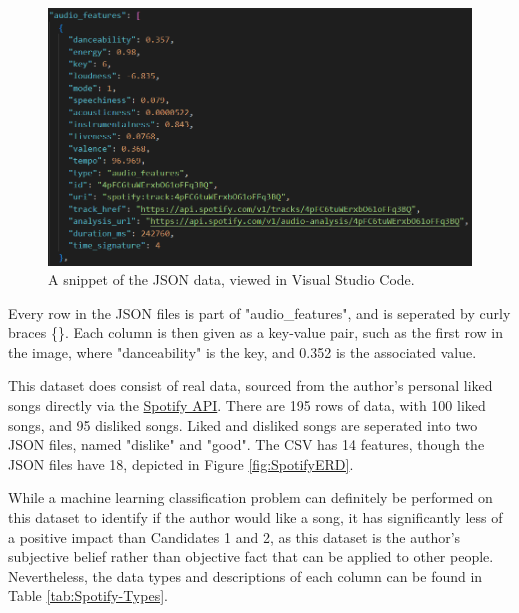 \documentclass[12pt]{report}
\begin{document}
\begin{figure}[H]
    \centering
    \includegraphics[width=.75\linewidth]{spotifySnippet.png}
    \caption{A snippet of the JSON data, viewed in Visual Studio Code.}
    \label{fig:spotifySnippet}
\end{figure}

Every row in the JSON files is part of "audio\_features", and is seperated by curly braces \{\}. Each column is then given as a 
key-value pair, such as the first row in the image, where "danceability" is the key, and 0.352 is the associated value.

\noindent This dataset does consist of real data, sourced from the author's personal liked songs directly via the 
\href{https://developer.spotify.com/documentation/web-api}{Spotify API}. There are 195 rows of data, with 100 liked songs, and 95 disliked songs.
Liked and disliked songs are seperated into two JSON files, named "dislike" and "good". The CSV has 14 features, though the JSON files have 18,
depicted in Figure \ref{fig:SpotifyERD}.


While a machine learning classification problem can definitely be performed on this dataset to identify if the author would like a song, 
it has significantly less of a positive impact than Candidates 1 and 2, as this dataset is the author's subjective belief rather than objective
fact that can be applied to other people. Nevertheless, the data types and descriptions of each column can be found in Table \ref{tab:Spotify-Types}.
\end{document}
